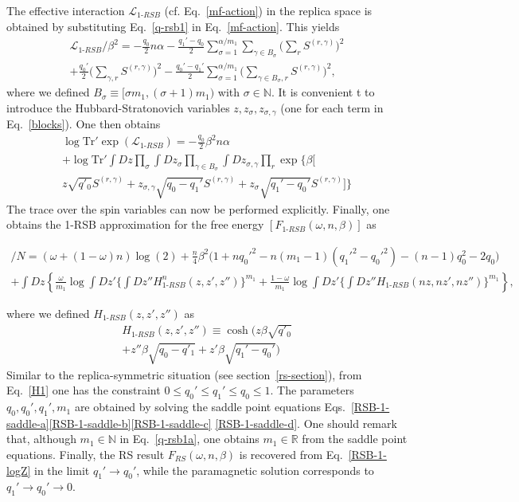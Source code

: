 \documentclass[twocolumn,superscriptaddress,prb,10pt]{revtex4-1}
\def\tr{\textrm{Tr}}
\begin{document}
The effective interaction ${\mathcal L}_{1\textrm{-}RSB}$ (cf. Eq.~\eqref{mf-action}) 
in the replica space is obtained by substituting Eq.~\eqref{q-rsb1} in Eq.~\eqref{mf-action}. 
This yields  
%
\begin{multline}
{\mathcal L}_{1\textrm{-}RSB}/\beta^2=-\frac{q_0}{2}n\alpha
-\frac{q_1'-q_0}{2}\sum\limits_{\sigma=1}^{\alpha/m_1}
\sum\limits_{\gamma\in B_\sigma}\Big(\sum_r S^{(r,\gamma)}\Big)^2\\
+\frac{q_0'}{2}\Big(\sum\limits_{\gamma,r}
S^{(r,\gamma)}\Big)^2-
\frac{q_0'-q_1'}{2}\sum\limits_{\sigma=1}^{\alpha/m_1}
\Big(\sum\limits_{\gamma\in B_\sigma,r}S^{(r,\gamma)}\Big)^2,
\label{blocks}
\end{multline}
%
where we defined $B_\sigma\equiv[\sigma m_1,(\sigma+1)m_1)$ with $\sigma\in\mathbb{N}$. 
It is convenient t to introduce the Hubbard-Stratonovich variables $z,z_\sigma,z_{\sigma,\gamma}$ 
(one for each term in Eq.~\eqref{blocks}). One then obtains 
%
\begin{multline}
\log\tr'\exp({\mathcal L}_{1\textrm{-}RSB})=
-\frac{q_0}{2}\beta^2 n\alpha\\
+\log\tr'\int Dz\prod_\sigma\int Dz_\sigma\prod\limits_{\gamma\in B_\sigma}
\int Dz_{\sigma,\gamma}\prod_r\exp\Big\{\beta\Big[\\\nonumber
z\sqrt{q'_0}S^{(r,\gamma)}
+z_{\sigma,\gamma}\sqrt{q_0-q_1'} S^{(r,\gamma)}+
z_{\sigma}\sqrt{q_1'-q_0'}S^{(r,\gamma)}\Big]\Big\}
\end{multline}
%
The trace over the spin variables can now be performed explicitly. Finally, 
one obtains the 1-RSB approximation for the free energy 
$[F_{1\textrm{-}RSB}(\omega,n,\beta)]$ as 
%
\begin{widetext}
\begin{multline}
[F_{1\textrm{-}RSB}(\omega,n\beta)]/N=
(\omega+(1-\omega)n)\log(2)+
\frac{n}{4}\beta^2\Big(1+nq_0'^2
-n(m_1-1)(q_1'^2-q_0'^2)-
(n-1)q_0^2-2q_0\Big)\\
+\int Dz\left\{\frac{\omega}{m_1}\log\int Dz'\Big\{\int Dz''
H_{1\textrm{-}RSB}^n(z,z',z'')\Big\}^{m_1}
+\frac{1-\omega}{m_1}
\log\int Dz'\Big\{\int Dz''
H_{1\textrm{-}RSB}(nz,nz',nz'')\Big\}^{m_1}
\right\}, 
\label{RSB-1-logZ}
\end{multline}
\end{widetext}
%
where we defined $H_{1\textrm{-}RSB}(z,z',z'')$ as 
%
\begin{multline}
H_{1\textrm{-}RSB}(z,z',z'')\equiv\cosh(z\beta\sqrt{q'_0}\\+
z''\beta\sqrt{q_0-q'_1} +z'\beta\sqrt{q_1'-q_0'})
\label{H1}
\end{multline}
%
Similar to the replica-symmetric situation (see section~\ref{rs-section}), 
from Eq.~\eqref{H1} one has the constraint $0\le q_0'\le q_1'\le q_0\le 1$.
The parameters $q_0,q_0',q_1',m_1$ are obtained by solving the saddle 
point equations Eqs.~\eqref{RSB-1-saddle-a}\eqref{RSB-1-saddle-b}\eqref{RSB-1-saddle-c}
\eqref{RSB-1-saddle-d}. One should remark that, although $m_1\in\mathbb{N}$ in 
Eq.~\eqref{q-rsb1a}, one obtains $m_1\in\mathbb{R}$ from the saddle point equations. 
Finally, the RS result $F_{RS}(\omega,n,\beta)$ is recovered from Eq.~\eqref{RSB-1-logZ} 
in the limit $q_1'\to q_0'$, while the paramagnetic solution corresponds to 
$q_1'\to q_0'\to 0$.
\end{document}
